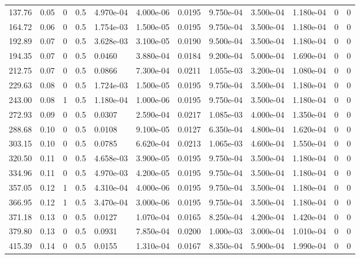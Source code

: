 \documentclass[preview]{standalone}
\begin{document}
{{\begin{tabular}{L{1.2cm}C{1.2cm} C{0.3cm}C{0.5cm} C{1.4cm}C{1.4cm} C{1.4cm}C{1.4cm} C{1.6cm}C{1.6cm} C{1.6cm}C{1.6cm}}
  137.76  &  0.05  & 0     & 0.5 &  4.970e-04  & 4.000e-06  &  0.0195&   9.750e-04& 3.500e-04 & 1.180e-04   &  0 & 0  \\ 
  164.72  &  0.06  & 0     & 0.5 &  1.754e-03  & 1.500e-05  &  0.0195&   9.750e-04& 3.500e-04 & 1.180e-04   &  0 & 0  \\ 
  192.89  &  0.07  & 0     & 0.5 &  3.628e-03  & 3.100e-05  &  0.0190&   9.500e-04& 3.500e-04 & 1.180e-04   &  0 & 0  \\ 
  194.35  &  0.07  & 0     & 0.5 &  0.0460  & 3.880e-04  &  0.0184&   9.200e-04& 5.000e-04 & 1.690e-04   &  0 & 0  \\ 
  212.75  &  0.07  & 0     & 0.5 &  0.0866  & 7.300e-04  &  0.0211&   1.055e-03& 3.200e-04 & 1.080e-04   &  0 & 0  \\ 
  229.63  &  0.08  & 0     & 0.5 &  1.724e-03  & 1.500e-05  &  0.0195&   9.750e-04& 3.500e-04 & 1.180e-04   &  0 & 0  \\ 
  243.00  &  0.08  & 1     & 0.5 &  1.180e-04  & 1.000e-06  &  0.0195&   9.750e-04& 3.500e-04 & 1.180e-04   &  0 & 0  \\ 
  272.93  &  0.09  & 0     & 0.5 &  0.0307  & 2.590e-04  &  0.0217&   1.085e-03& 4.000e-04 & 1.350e-04   &  0 & 0  \\ 
  288.68  &  0.10  & 0     & 0.5 &  0.0108  & 9.100e-05  &  0.0127&   6.350e-04& 4.800e-04 & 1.620e-04   &  0 & 0  \\ 
  303.15  &  0.10  & 0     & 0.5 &  0.0785  & 6.620e-04  &  0.0213&   1.065e-03& 4.600e-04 & 1.550e-04   &  0 & 0  \\ 
  320.50  &  0.11  & 0     & 0.5 &  4.658e-03  & 3.900e-05  &  0.0195&   9.750e-04& 3.500e-04 & 1.180e-04   &  0 & 0  \\ 
  334.96  &  0.11  & 0     & 0.5 &  4.970e-03  & 4.200e-05  &  0.0195&   9.750e-04& 3.500e-04 & 1.180e-04   &  0 & 0  \\ 
  357.05  &  0.12  & 1     & 0.5 &  4.310e-04  & 4.000e-06  &  0.0195&   9.750e-04& 3.500e-04 & 1.180e-04   &  0 & 0  \\ 
  366.95  &  0.12  & 1     & 0.5 &  3.470e-04  & 3.000e-06  &  0.0195&   9.750e-04& 3.500e-04 & 1.180e-04   &  0 & 0  \\ 
  371.18  &  0.13  & 0     & 0.5 &  0.0127  & 1.070e-04  &  0.0165&   8.250e-04& 4.200e-04 & 1.420e-04   &  0 & 0  \\ 
  379.80  &  0.13  & 0     & 0.5 &  0.0931  & 7.850e-04  &  0.0200&   1.000e-03& 3.000e-04 & 1.010e-04   &  0 & 0  \\ 
  415.39  &  0.14  & 0     & 0.5 &  0.0155  & 1.310e-04  &  0.0167&   8.350e-04& 5.900e-04 & 1.990e-04   &  0 & 0  \\ 

\end{tabular}}}
\end{document}
